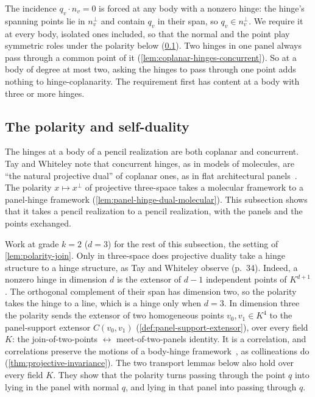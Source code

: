 The incidence $q_v \cdot n_v = 0$ is forced at any body with a nonzero
hinge: the hinge's spanning points lie in $n_v^{\perp}$ and contain
$q_v$ in their span, so $q_v \in n_v^{\perp}$. We require it at every
body, isolated ones included, so that the normal and the point play
symmetric roles under the polarity below (\cref{sec:pencil-duality}).
Two hinges in one panel always pass through a common point of it
(\cref{lem:coplanar-hinges-concurrent}). So at a body of degree at most
two, asking the hinges to pass through one point adds nothing to
hinge-coplanarity. The requirement first has content at a body with
three or more hinges.

\subsection{The polarity and self-duality}
\label{sec:pencil-duality}

The hinges at a body of a pencil realization are both coplanar and
concurrent. Tay and Whiteley note that concurrent hinges, as in models
of molecules, are ``the natural projective dual'' of coplanar ones, as
in flat architectural panels~\cite[p.~33]{tayWhiteley1984}. The
polarity $x \mapsto x^{\perp}$ of projective three-space takes a
molecular framework to a panel-hinge framework
(\cref{lem:panel-hinge-dual-molecular}). This subsection shows that it
takes a pencil realization to a pencil realization, with the panels and
the points exchanged.

Work at grade $k = 2$ ($d = 3$) for the rest of this subsection, the
setting of \cref{lem:polarity-join}. Only in three-space does projective
duality take a hinge structure to a hinge structure, as Tay and Whiteley
observe (p.~34). Indeed, a nonzero hinge in dimension $d$ is the
extensor of $d - 1$ independent points of $K^{d+1}$. The orthogonal
complement of their span has dimension two, so the polarity takes the
hinge to a line, which is a hinge only when $d = 3$. In dimension three
the polarity sends the extensor of two homogeneous points
$v_0, v_1 \in K^4$ to the panel-support extensor $C(v_0,v_1)$
(\cref{def:panel-support-extensor}), over every field $K$: the
join-of-two-points $\leftrightarrow$ meet-of-two-panels identity. It is
a correlation, and correlations preserve the motions of a body-hinge
framework~\cite[\S3.6, p.~68]{crapoWhiteley1982}, as collineations do
(\cref{thm:projective-invariance}). The two transport lemmas below also
hold over every field $K$. They show that the polarity turns passing
through the point $q$ into lying in the panel with normal $q$, and lying
in that panel into passing through $q$.

